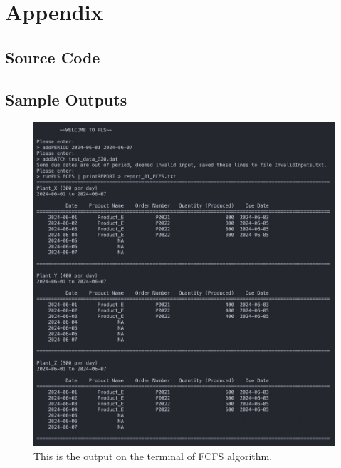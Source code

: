 \documentclass[conference]{IEEEtran}
\begin{document}
\section{\textbf{Appendix}}

\subsection{Source Code}


\subsection{Sample Outputs}

\begin{figure}[htbp]
\centering
\includegraphics[width=0.6\columnwidth]{Figures/1.jpg}
\caption{This is the output on the terminal of FCFS algorithm.}
\label{fig:FCFS}
\end{figure}
\end{document}
